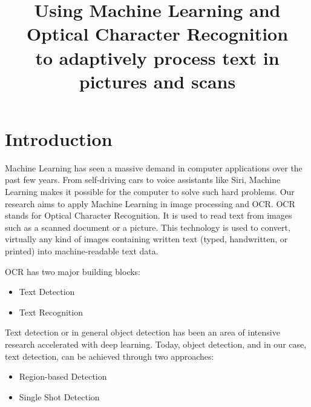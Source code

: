 \documentclass[conference]{IEEEtran}
\begin{document}
\title{Using Machine Learning and Optical Character Recognition\\to adaptively process text in pictures and scans}


\author{
\and
{}
}


\maketitle

\section{Introduction}\label{section:Introduction}


Machine Learning has seen a massive demand in computer applications over the past few years. From self-driving cars to voice assistants like Siri, Machine Learning makes it possible for the computer to solve such hard problems. Our research aims to apply Machine Learning in image processing and OCR.
OCR stands for Optical Character Recognition. It is used to read text from images such as a scanned document or a picture. This technology is used to convert, virtually any kind of images containing written text (typed, handwritten, or printed) into machine-readable text data.

OCR has two major building blocks:

\begin{itemize}
	\item Text Detection
	\item Text Recognition
\end{itemize}

Text detection or in general object detection has been an area of intensive research accelerated with deep learning. Today, object detection, and in our case, text detection, can be achieved through two approaches:

\begin{itemize}
	\item Region-based Detection
	\item Single Shot Detection
\end{itemize}
\end{document}
